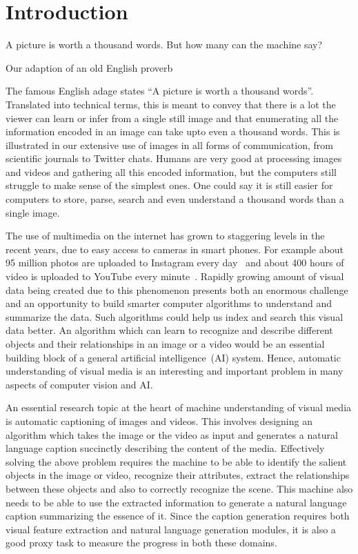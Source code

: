 \chapter{Introduction}
\label{chapter:intro}
\setlength{\epigraphwidth}{\textwidth}
\epigraph{A picture is worth a thousand words. But how many can the machine
say?}{Our adaption of an old English proverb}

\noindent The famous English adage states ``A picture is worth a thousand
words''.
Translated into technical terms, this is meant to convey that there is a lot the
viewer can learn or infer from a single still image and that enumerating all the
information encoded in an image can take upto even a thousand words.
This is illustrated in our extensive use of images in all forms of
communication, from scientific journals to Twitter chats. 
%
Humans are very good at processing images and videos and gathering all this
encoded information, but the computers still struggle to make sense of the
simplest ones.
%
One could say it is still easier for computers to store, parse, search and even
understand a thousand words than a single image.
%

The use of multimedia on the internet has grown to staggering levels in the
recent years, due to easy access to cameras in smart phones.
For example about 95 million photos are uploaded to Instagram every
day~\cite{InstStats} and about 400 hours of video is uploaded to YouTube every
minute~\cite{YouStats}.
%
Rapidly growing amount of visual data being created due to this phenomenon
presents both an enormous challenge and an opportunity to build smarter
computer algorithms to understand and summarize the data.
Such algorithms could help us index and search this visual data better.
An algorithm which can learn to recognize and describe different objects and
their relationships in an image or a video would be an essential building block
of a general artificial intelligence~(AI) system.
Hence, automatic understanding of visual media is an interesting and important
problem in many aspects of computer vision and AI.
%

An essential research topic at the heart of machine understanding of visual
media is automatic captioning of images and videos.
This involves designing an algorithm which takes the image or the video as
input and generates a natural language caption succinctly describing the
content of the media.
Effectively solving the above problem requires the machine to be able to
identify the salient objects in the image or video, recognize their attributes,
extract the relationships between these objects and also to correctly recognize
the scene.
This machine also needs to be able to use the extracted information to generate
a natural language caption summarizing the essence of it.
Since the caption generation requires both visual feature extraction and
natural language generation modules, it is also a good proxy task to measure
the progress in both these domains. 

